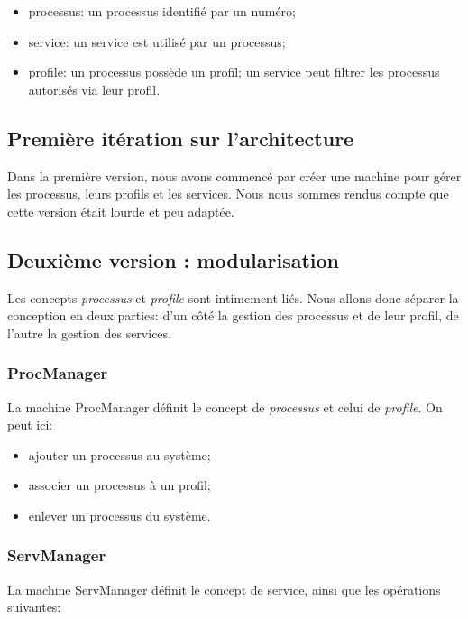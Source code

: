 \documentclass[french, titlepage, 10pt, a4paper]{article}
\begin{document}
\begin{itemize}
  \item processus: un processus identifié par un numéro;
  \item service: un service est utilisé par un processus;
  \item profile: un processus possède un profil; un service peut filtrer les
    processus autorisés via leur profil.
\end{itemize}

    \subsection{Première itération sur l'architecture}

        Dans la première version, nous avons commencé par créer une machine pour gérer
        les processus, leurs profils et les services.
        Nous nous sommes rendus compte que cette version était lourde et peu adaptée.

    \subsection{Deuxième version : modularisation}

        Les concepts \emph{processus} et \emph{profile} sont intimement liés.
        Nous allons donc séparer la conception en deux parties: d'un côté la gestion des
        processus et de leur profil, de l'autre la gestion des services.

        \subsubsection{ProcManager}

            La machine ProcManager définit le concept de \emph{processus} et celui de
            \emph{profile}. On peut ici:

                \begin{itemize}
                    \item ajouter un processus au système;
                    \item associer un processus à un profil;
                    \item enlever un processus du système.
                \end{itemize}

        \subsubsection{ServManager}
            La machine ServManager définit le concept de service, ainsi que les opérations suivantes:
\end{document}
